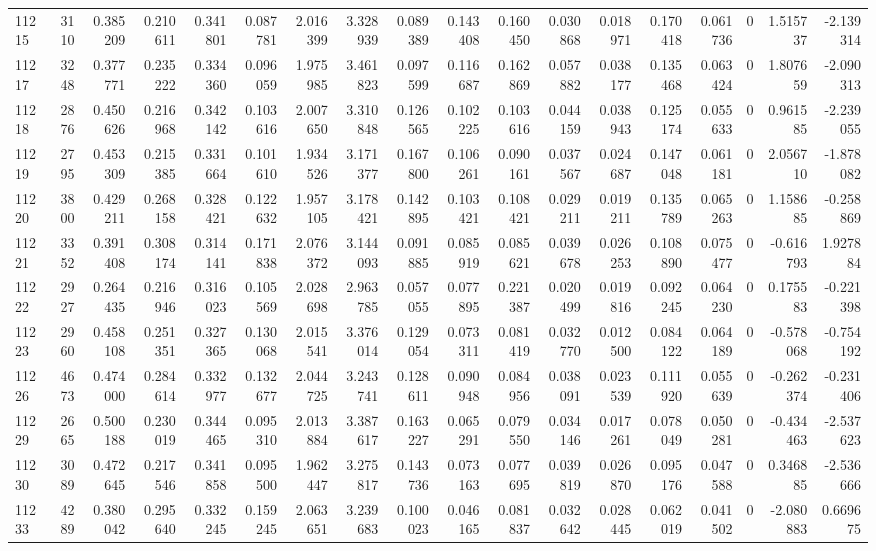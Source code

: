 \begin{tabular}{lrrrrrrrrrrrrrrrrr}
11215 & 3110 & 0.385209 & 0.210611 & 0.341801 & 0.087781 & 2.016399 & 3.328939 & 0.089389 & 0.143408 & 0.160450 & 0.030868 & 0.018971 & 0.170418 & 0.061736 & 0 & 1.515737 & -2.139314 \\
11217 & 3248 & 0.377771 & 0.235222 & 0.334360 & 0.096059 & 1.975985 & 3.461823 & 0.097599 & 0.116687 & 0.162869 & 0.057882 & 0.038177 & 0.135468 & 0.063424 & 0 & 1.807659 & -2.090313 \\
11218 & 2876 & 0.450626 & 0.216968 & 0.342142 & 0.103616 & 2.007650 & 3.310848 & 0.126565 & 0.102225 & 0.103616 & 0.044159 & 0.038943 & 0.125174 & 0.055633 & 0 & 0.961585 & -2.239055 \\
11219 & 2795 & 0.453309 & 0.215385 & 0.331664 & 0.101610 & 1.934526 & 3.171377 & 0.167800 & 0.106261 & 0.090161 & 0.037567 & 0.024687 & 0.147048 & 0.061181 & 0 & 2.056710 & -1.878082 \\
11220 & 3800 & 0.429211 & 0.268158 & 0.328421 & 0.122632 & 1.957105 & 3.178421 & 0.142895 & 0.103421 & 0.108421 & 0.029211 & 0.019211 & 0.135789 & 0.065263 & 0 & 1.158685 & -0.258869 \\
11221 & 3352 & 0.391408 & 0.308174 & 0.314141 & 0.171838 & 2.076372 & 3.144093 & 0.091885 & 0.085919 & 0.085621 & 0.039678 & 0.026253 & 0.108890 & 0.075477 & 0 & -0.616793 & 1.927884 \\
11222 & 2927 & 0.264435 & 0.216946 & 0.316023 & 0.105569 & 2.028698 & 2.963785 & 0.057055 & 0.077895 & 0.221387 & 0.020499 & 0.019816 & 0.092245 & 0.064230 & 0 & 0.175583 & -0.221398 \\
11223 & 2960 & 0.458108 & 0.251351 & 0.327365 & 0.130068 & 2.015541 & 3.376014 & 0.129054 & 0.073311 & 0.081419 & 0.032770 & 0.012500 & 0.084122 & 0.064189 & 0 & -0.578068 & -0.754192 \\
11226 & 4673 & 0.474000 & 0.284614 & 0.332977 & 0.132677 & 2.044725 & 3.243741 & 0.128611 & 0.090948 & 0.084956 & 0.038091 & 0.023539 & 0.111920 & 0.055639 & 0 & -0.262374 & -0.231406 \\
11229 & 2665 & 0.500188 & 0.230019 & 0.344465 & 0.095310 & 2.013884 & 3.387617 & 0.163227 & 0.065291 & 0.079550 & 0.034146 & 0.017261 & 0.078049 & 0.050281 & 0 & -0.434463 & -2.537623 \\
11230 & 3089 & 0.472645 & 0.217546 & 0.341858 & 0.095500 & 1.962447 & 3.275817 & 0.143736 & 0.073163 & 0.077695 & 0.039819 & 0.026870 & 0.095176 & 0.047588 & 0 & 0.346885 & -2.536666 \\
11233 & 4289 & 0.380042 & 0.295640 & 0.332245 & 0.159245 & 2.063651 & 3.239683 & 0.100023 & 0.046165 & 0.081837 & 0.032642 & 0.028445 & 0.062019 & 0.041502 & 0 & -2.080883 & 0.669675 \\

\end{tabular}
